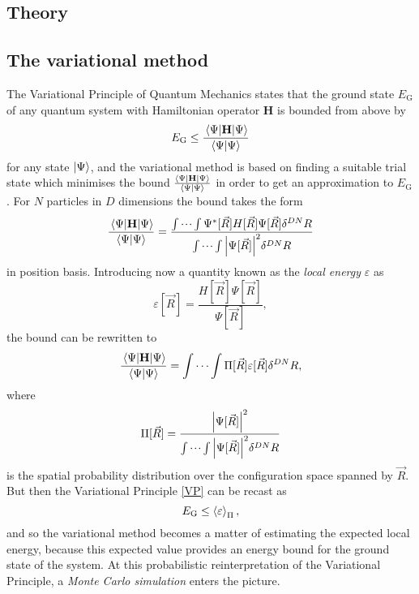 \documentclass[a4paper,8pt]{article}
\begin{document}
\begin{multicols}{2}
\section{Theory}\label{theory}

\subsection{The variational method} \label{varmethod}
The Variational Principle of Quantum Mechanics states that the ground state $E_\text{G}$ of any quantum system with Hamiltonian operator $\mathbf{H}$ is bounded from above by
\begin{equation}\label{VP}
E_\text{G} \leq \frac{\ev{\mathbf{H}}{\Psi}}{\braket{\Psi}{\Psi}}
\end{equation}
for any state $\ket{\Psi}$, and the variational method is based on finding a suitable trial state which minimises the bound $\frac{\ev{\mathbf{H}}{\Psi}}{\braket{\Psi}{\Psi}}$ in order to get an approximation to $E_\text{G}$. For $N$ particles in $D$ dimensions the bound takes the form
\begin{align}
\frac{\ev{\mathbf{H}}{\Psi}}{\braket{\Psi}{\Psi}} = \frac{\idotsint \Psi^*[\vec{R}]H[\vec{R}]\Psi[\vec{R}]\delta^{DN}R}{\idotsint \abs{\Psi[\vec{R}]}^2\delta^{DN}R} \nonumber
\end{align}
in position basis. Introducing now a quantity known as the \textit{local energy} $\varepsilon$ as
\begin{equation}\label{localenergy}
\varepsilon[\vec{R}] = \frac{H[\vec{R}]\Psi[\vec{R}]}{\Psi[\vec{R}]},
\end{equation}
the bound can be rewritten to
\begin{equation}
\frac{\ev{\mathbf{H}}{\Psi}}{\braket{\Psi}{\Psi}} = \idotsint \Pi[\vec{R}]\varepsilon[\vec{R}] \delta^{DN}R, \nonumber
\end{equation}
where
\begin{equation}\label{distribution}
\Pi[\vec{R}] = \frac{\abs{\Psi[\vec{R}]}^2}{\idotsint \abs{\Psi[\vec{R}]}^2\delta^{DN}R} 
\end{equation}
is the spatial probability distribution over the configuration space spanned by $\vec{R}$. But then the Variational Principle \eqref{VP} can be recast as
\begin{equation}
E_\text{G} \leq \ev{\varepsilon}_\Pi,
\end{equation}
and so the variational method becomes a matter of estimating the expected local energy, because this expected value provides an energy bound for the ground state of the system. At this probabilistic reinterpretation of the Variational Principle, a \textit{Monte Carlo simulation} enters the picture.


\end{multicols}
\end{document}
